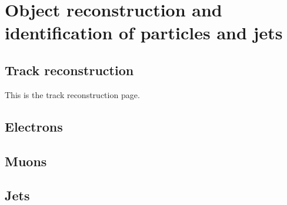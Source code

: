 \chapter{Object reconstruction and identification of particles and jets}
\label{sec:reconstruction-and-identification}


\section{Track reconstruction}
\label{sec:track-reconstruction}

This is the track reconstruction page.

\section{Electrons}
\label{id-electrons}

\section{Muons}
\label{id-muons}


\section{Jets}
\label{sec:reco-jets}